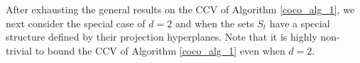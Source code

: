  After exhausting the general results on the CCV of Algorithm \ref{coco_alg_1}, we next consider the special case of $d=2$ and when the sets $S_t$ have a special structure defined by their projection hyperplanes. 
 Note that it is highly non-trivial to bound the CCV of Algorithm \ref{coco_alg_1} even when $d=2$.
 
  
